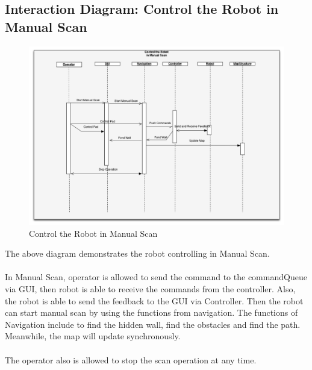 \documentclass[11pt, a4paper]{report}
\begin{document}
\subsection{Interaction Diagram: Control the Robot in Manual Scan}
\begin{figure}[h]
  \centering
    \includegraphics[width=16cm]{Seq3.png}
  \caption{Control the Robot in Manual Scan}
\end{figure}
The above diagram demonstrates the robot controlling in Manual Scan.\\ \\
In Manual Scan, operator is allowed to send the command to the commandQueue via GUI, then robot is able to receive the commands from the controller. Also, the robot is able to send the feedback to the GUI via Controller. Then the robot can start manual scan by using the functions from navigation. The functions of  Navigation include to find the hidden wall, find the obstacles and find the path. Meanwhile, the map will update synchronously.\\ \\
The operator also is allowed to stop the scan operation at any time.    
\pagebreak
\end{document}

